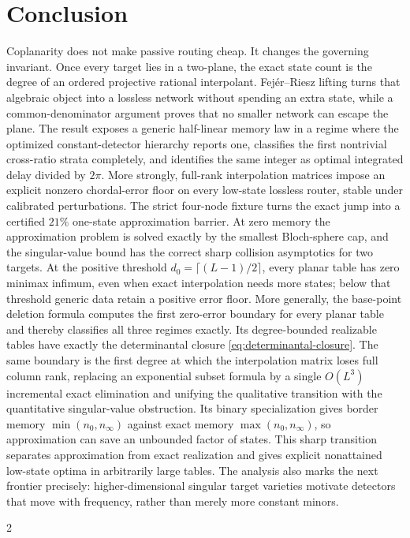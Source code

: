 \documentclass[11pt]{article}
\theoremstyle{definition}\newtheorem{definition}[theorem]{Definition}\newtheorem{example}[theorem]{Example}
\theoremstyle{remark}\newtheorem{remark}[theorem]{Remark}\newtheorem{limitation}[theorem]{Limitation}
\begin{document}
\section{Conclusion}

Coplanarity does not make passive routing cheap.  It changes the governing
invariant.  Once every target lies in a two-plane, the exact state count is the
degree of an ordered projective rational interpolant.  Fej\'er--Riesz lifting
turns that algebraic object into a lossless network without spending an extra
state, while a common-denominator argument proves that no smaller network can
escape the plane.  The result exposes a generic half-linear memory law in a
regime where the optimized constant-detector hierarchy reports one, classifies
the first nontrivial
cross-ratio strata completely, and identifies the same integer as optimal
integrated delay divided by $2\pi$.  More strongly, full-rank interpolation
matrices impose an explicit nonzero chordal-error floor on every low-state
lossless router, stable under calibrated perturbations.  The strict four-node
fixture turns the exact jump into a certified $21\%$ one-state approximation
barrier.  At zero memory the approximation problem is solved exactly by the
smallest Bloch-sphere cap, and the singular-value bound has the correct sharp
collision asymptotics for two targets.  At the positive threshold
$d_0=\lceil(L-1)/2\rceil$, every planar table has zero minimax infimum, even
when exact interpolation needs more states; below that threshold generic data
retain a positive error floor.  More generally, the base-point deletion
formula computes the first zero-error boundary for every planar table and
thereby classifies all three regimes exactly.  Its degree-bounded realizable
tables have exactly the determinantal closure
\eqref{eq:determinantal-closure}.  The same boundary is the first degree at
which the interpolation matrix loses full column rank, replacing an
exponential subset formula by a single $O(L^3)$ incremental exact elimination
and unifying the
qualitative transition with the quantitative singular-value obstruction.  Its binary specialization gives
border memory $\min(n_0,n_\infty)$ against exact memory
$\max(n_0,n_\infty)$, so approximation can save an unbounded factor of states.
This sharp transition separates approximation from exact realization and gives
explicit nonattained low-state optima in arbitrarily large tables.  The
analysis also marks the next frontier precisely:
higher-dimensional singular target varieties motivate detectors that move with
frequency, rather than merely more constant minors.

\clearpage
\begin{multicols}{2}


\end{multicols}
\end{document}
